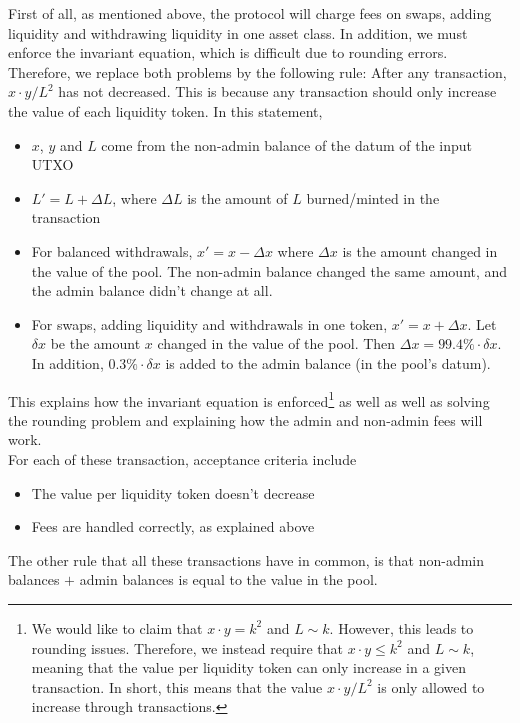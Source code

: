\documentclass{article}
\begin{document}
First of all, as mentioned above, the protocol will charge fees on swaps, adding
liquidity and withdrawing liquidity in one asset class. In addition, we must
enforce the invariant equation, which is difficult due to rounding errors.
Therefore, we replace both problems by the following rule: After any
transaction, $x \cdot y / L^2$ has not decreased. This is because any
transaction should only increase the value of each liquidity token. In this
statement,
\begin{itemize}
  \item $x$, $y$ and $L$ come from the non-admin balance of the datum of the
    input UTXO
  \item $L' = L + \Delta L$, where $\Delta L$ is the amount of $L$ burned/minted
    in the transaction
  \item For balanced withdrawals, $x' = x - \Delta x$ where $\Delta x$ is the
    amount changed in the value of the pool. The non-admin balance changed the
    same amount, and the admin balance didn't change at all.
  \item For swaps, adding liquidity and withdrawals in one token, $x' = x +
    \Delta x$. Let $\delta x$ be the amount $x$ changed in the value of the
    pool. Then $\Delta x = 99.4\% \cdot \delta x$. In addition, $0.3\% \cdot
    \delta x$ is added to the admin balance (in the pool's datum).
\end{itemize}
This explains how the invariant equation is enforced\footnote{
  We would like to claim that $x \cdot y = k^2$ and $L \sim k$. However, this
  leads to rounding issues. Therefore, we instead require that $x \cdot y \leq
  k^2$ and $L \sim k$, meaning that the value per liquidity token can only
  increase in a given transaction. In short, this means that the value $x \cdot
  y / L^2$ is only allowed to increase through transactions.
} as well as well as solving the rounding problem and explaining how the admin
and non-admin fees will work. \\

For each of these transaction, acceptance criteria include
\begin{itemize}
  \item The value per liquidity token doesn't decrease
  \item Fees are handled correctly, as explained above
\end{itemize}

The other rule that all these transactions have in common, is that non-admin
balances $+$ admin balances is equal to the value in the pool.
\end{document}
